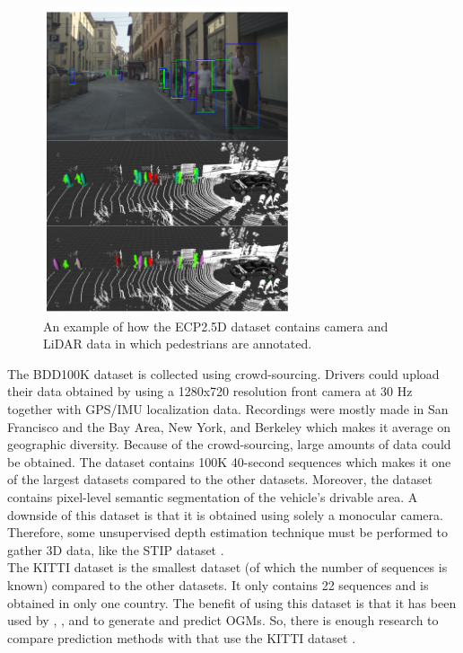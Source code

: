 \begin{figure}[h!]
	\centering
	\includegraphics[width=0.4\linewidth]{Figures/Datasets/ECP_Dataset}
	\caption{An example of how the \gls{ECP2.5D} \cite{braun2020ecp2} dataset contains camera and LiDAR data in which pedestrians are annotated.}  
	\label{fig:dat_ecp}
\end{figure}

The \gls{BDD100K} dataset \cite{yu2020bdd100k} is collected using crowd-sourcing. Drivers could upload their data obtained by using a 1280x720 resolution front camera at 30 Hz together with GPS/IMU localization data. Recordings were mostly made in San Francisco and the Bay Area, New York, and Berkeley which makes it average on geographic diversity. Because of the crowd-sourcing, large amounts of data could be obtained. The dataset contains 100K 40-second sequences which makes it one of the largest datasets compared to the other datasets. Moreover, the dataset contains pixel-level semantic segmentation of the vehicle's drivable area. A downside of this dataset is that it is obtained using solely a monocular camera. Therefore, some unsupervised depth estimation technique must be performed to gather 3D data, like the \gls{STIP} dataset \cite{liu2020spatiotemporal}. \\

The \gls{KITTI} dataset \cite{geiger2012we} is the smallest dataset (of which the number of sequences is known) compared to the other datasets. It only contains 22 sequences and is obtained in only one country. The benefit of using this dataset is that it has been used by \cite{itkina2019dynamic}, \cite{mohajerin2019multi}, and \cite{lange2020attention} to generate and predict \glspl{OGM}. So, there is enough research to compare prediction methods with that use the \gls{KITTI} dataset \cite{geiger2012we}. \\

